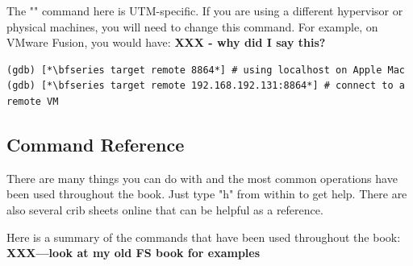 \noindent
The "" command here is UTM-specific. If you are using a different hypervisor or physical machines, you will need to change this command. For example, on VMware Fusion, you would have: \textbf{XXX - why did I say this?}

\begin{lstlisting}
(gdb) [*\bfseries target remote 8864*] # using localhost on Apple Mac
(gdb) [*\bfseries target remote 192.168.192.131:8864*] # connect to a remote VM
\end{lstlisting}


\subsection{ Command Reference}

There are many things you can do with  and the most common operations have been used throughout the book. Just type "h" from within  to get help. There are also several crib sheets online that can be helpful as a reference.

Here is a summary of the commands that have been used throughout the book: \textbf{XXX---look at my old FS book for examples}

